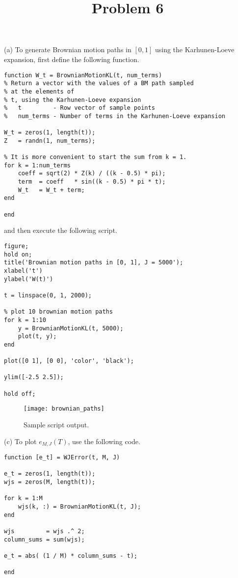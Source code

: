 \documentclass[a4paper] {article}
\title{\vspace{-1cm} Problem 6}
\date{}
\author{}
\begin{document}
\maketitle
(a) To generate Brownian motion paths in $[0, 1]$ using the Karhunen-Loeve expansion, first
define the following function.
  
\begin{lstlisting}[caption=BrownianMotionKL.m]
function W_t = BrownianMotionKL(t, num_terms)
% Return a vector with the values of a BM path sampled 
% at the elements of
% t, using the Karhunen-Loeve expansion
%   t         - Row vector of sample points
%   num_terms - Number of terms in the Karhunen-Loeve expansion

W_t = zeros(1, length(t));
Z   = randn(1, num_terms);

% It is more convenient to start the sum from k = 1.
for k = 1:num_terms
	coeff = sqrt(2) * Z(k) / ((k - 0.5) * pi);
	term  = coeff   * sin((k - 0.5) * pi * t);
	W_t   = W_t + term;
end

end
\end{lstlisting}

and then execute the following script.

\begin{lstlisting}[caption=PlotBrownianMotionPaths.m]
figure; 
hold on;
title('Brownian motion paths in [0, 1], J = 5000');
xlabel('t')
ylabel('W(t)')

t = linspace(0, 1, 2000);

% plot 10 brownian motion paths
for k = 1:10
    y = BrownianMotionKL(t, 5000);
    plot(t, y);
end

plot([0 1], [0 0], 'color', 'black');

ylim([-2.5 2.5]);

hold off;
\end{lstlisting}

\begin{figure}[h]
\centering
\texttt{[image: brownian\_paths]}
\caption{Sample script output.}
\end{figure}
\vspace{1cm}

(c) To plot $e_{M,J}(T)$, use the following code.

\begin{lstlisting}[caption=WJError.m]
function [e_t] = WJError(t, M, J)

e_t = zeros(1, length(t));
wjs = zeros(M, length(t));

for k = 1:M
    wjs(k, :) = BrownianMotionKL(t, J);
end

wjs         = wjs .^ 2;
column_sums = sum(wjs); 

e_t = abs( (1 / M) * column_sums - t);

end
\end{lstlisting}
\end{document}
